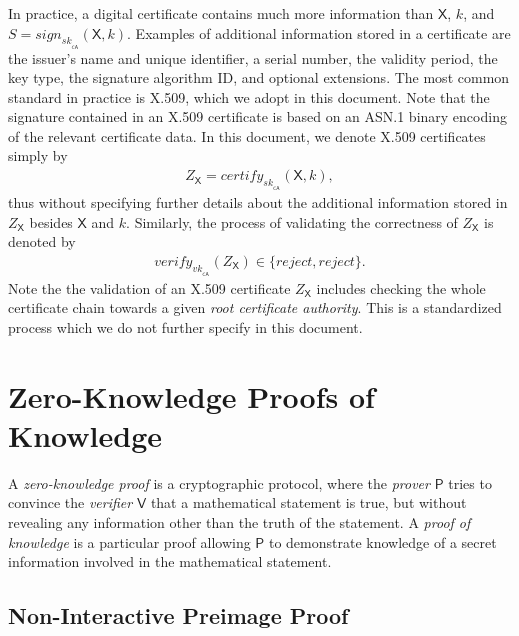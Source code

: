 \documentclass[bibtotoc,halfparskip,oneside]{scrreprt}
\newcommand{\sk}[1]{\mathit{sk}_{#1}\xspace}
\newcommand{\vk}[1]{\mathit{vk}_{#1}\xspace}
\newcommand{\SK}[1]{\sk{_#1}\xspace}
\newcommand{\VK}[1]{\vk{_#1}\xspace}
\newcommand{\CA}{\ensuremath{\mathsf{CA}}\xspace}
\newcommand{\Prover}{\ensuremath{\mathsf{P}}\xspace}
\newcommand{\Verifier}{\ensuremath{\mathsf{V}}\xspace}
\begin{document}
	In practice, a digital certificate contains much more information than $\mathsf{X}$, $k$, and $S=\mathit{sign}_{\SK{\CA}}(\mathsf{X},k)$. Examples of additional information stored in a certificate are the issuer's name and unique identifier, a serial number, the validity period, the key type, the signature algorithm ID, and optional extensions. The most common standard in practice is X.509, which we adopt in this document. Note that the signature contained in an X.509 certificate is based on an ASN.1 binary encoding of the relevant certificate data. In this document, we denote X.509 certificates simply by
	\begin{align}
		Z_{\mathsf{X}}=\mathit{certify}_{\SK{\CA}}(\mathsf{X},k),
	\end{align}
	thus without specifying further details about the additional information stored in $Z_{\mathsf{X}}$ besides $\mathsf{X}$ and $k$. Similarly, the process of validating the correctness of $Z_{\mathsf{X}}$ is denoted by 
	\begin{align}
		\mathit{verify}_{\VK{\CA}}(Z_{\mathsf{X}})\in\{\mathit{reject},\mathit{reject}\}.
	\end{align}
	Note the the validation of an X.509 certificate $Z_{\mathsf{X}}$ includes checking the whole certificate chain towards a given \emph{root certificate authority}. This is a standardized process which we do not further specify  in this document.
	
	\section{Zero-Knowledge Proofs of Knowledge}\label{zkp}
	
	A \emph{zero-knowledge proof} is a cryptographic protocol, where the \emph{prover} $\Prover$ tries to convince the \emph{verifier} $\Verifier$ that a mathematical statement is true, but without revealing any  information other than the truth of the statement. A \emph{proof of knowledge} is a particular proof allowing $\Prover$ to demonstrate knowledge of a secret information involved in the mathematical statement.
	
	\subsection{Non-Interactive Preimage Proof}
	
\end{document}
